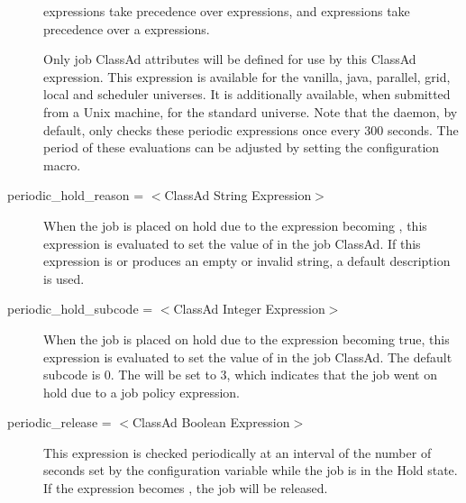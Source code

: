 \begin{description}
 expressions take
precedence over  expressions,
and  expressions take
precedence over a  expressions.

Only job ClassAd attributes will be defined for use by this ClassAd expression.
This expression is available for the vanilla, java, parallel, grid,
local and scheduler universes.
It is additionally available, when submitted from a Unix machine,
for the standard universe.  Note that the  daemon,
by default, only checks
these periodic expressions once every 300 seconds.  The period of
these evaluations can be adjusted by setting the
 configuration macro.

\item[periodic\_hold\_reason = $<$ClassAd String Expression$>$]
When the job is placed on hold due to the 
expression becoming , this expression is evaluated to
set the value of  in the job ClassAd.
If this expression is  or produces an empty or invalid string,
a default description is used.

\item[periodic\_hold\_subcode = $<$ClassAd Integer Expression$>$]
When the job is placed on hold due to the 
expression becoming true, this expression is evaluated to set the
value of  in the job ClassAd.
The default subcode is 0.  The  will be set to 3, which
indicates that the job went on hold due to a job policy expression.


\label{condor-submit-periodic-release}
\item[periodic\_release = $<$ClassAd Boolean Expression$>$]
This expression is checked periodically at an interval of
the number of seconds set by
the configuration variable 
while the job is in the Hold state.
If the expression becomes , the job will be released.

%


\end{description}
